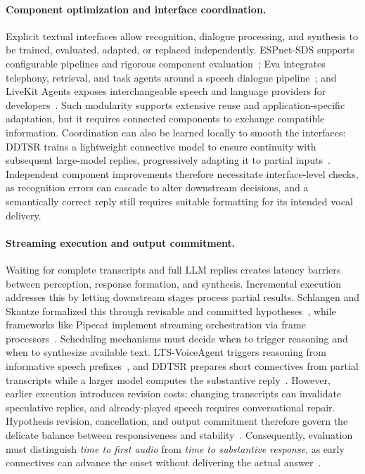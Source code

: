 \paragraph{Component optimization and interface coordination.}
Explicit textual interfaces allow recognition, dialogue processing, and synthesis to be trained, evaluated, adapted, or replaced independently. ESPnet-SDS supports configurable pipelines and rigorous component evaluation~\citep{DBLP:conf/naacl/Arora0STCBFKTSS25}; Eva integrates telephony, retrieval, and task agents around a speech dialogue pipeline~\citep{DBLP:conf/ifaamas/QinZ25}; and LiveKit Agents exposes interchangeable speech and language providers for developers~\citep{livekitagentsdocs}. Such modularity supports extensive reuse and application-specific adaptation, but it requires connected components to exchange compatible information. Coordination can also be learned locally to smooth the interfaces: DDTSR trains a lightweight connective model to ensure continuity with subsequent large-model replies, progressively adapting it to partial inputs~\citep{DBLP:journals/corr/abs-2602-23266}. Independent component improvements therefore necessitate interface-level checks, as recognition errors can cascade to alter downstream decisions, and a semantically correct reply still requires suitable formatting for its intended vocal delivery.

\paragraph{Streaming execution and output commitment.}
Waiting for complete transcripts and full LLM replies creates latency barriers between perception, response formation, and synthesis. Incremental execution addresses this by letting downstream stages process partial results. Schlangen and Skantze formalized this through revisable and committed hypotheses~\citep{DBLP:journals/dad/SchlangenS11}, while frameworks like Pipecat implement streaming orchestration via frame processors~\citep{pipecatdocs}. Scheduling mechanisms must decide when to trigger reasoning and when to synthesize available text. LTS-VoiceAgent triggers reasoning from informative speech prefixes~\citep{DBLP:journals/corr/abs-2601-19952}, and DDTSR prepares short connectives from partial transcripts while a larger model computes the substantive reply~\citep{DBLP:journals/corr/abs-2602-23266}. However, earlier execution introduces revision costs: changing transcripts can invalidate speculative replies, and already-played speech requires conversational repair. Hypothesis revision, cancellation, and output commitment therefore govern the delicate balance between responsiveness and stability~\citep{DBLP:journals/dad/SchlangenS11}. Consequently, evaluation must distinguish \textit{time to first audio} from \textit{time to substantive response}, as early connectives can advance the onset without delivering the actual answer~\citep{DBLP:journals/corr/abs-2602-23266}. 

